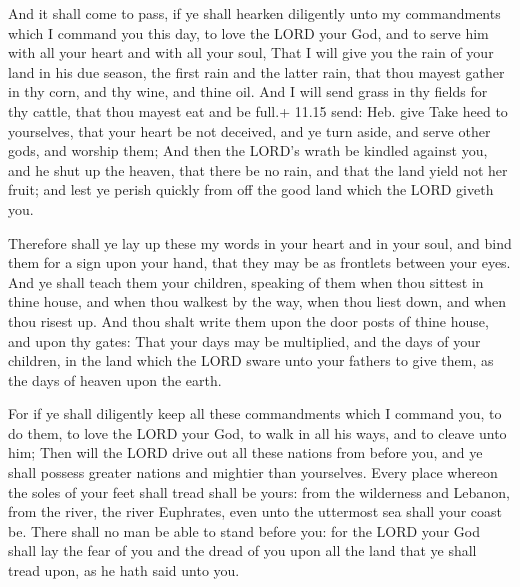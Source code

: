  And it shall come to pass, if ye shall hearken
diligently unto my commandments which I command you this day, to love
the LORD your God, and to serve him with all your heart and with all
your soul,  That I will give you the rain of your land in
his due season, the first rain and the latter rain, that thou mayest
gather in thy corn, and thy wine, and thine oil.  And I
will send grass in thy fields for thy cattle, that thou mayest eat and
be full.+ 11.15 send: Heb. give  Take heed to yourselves,
that your heart be not deceived, and ye turn aside, and serve other
gods, and worship them;  And then the LORD's wrath be
kindled against you, and he shut up the heaven, that there be no rain,
and that the land yield not her fruit; and lest ye perish quickly from
off the good land which the LORD giveth you.

 Therefore shall ye lay up these my words in your heart
and in your soul, and bind them for a sign upon your hand, that they may
be as frontlets between your eyes.  And ye shall teach them
your children, speaking of them when thou sittest in thine house, and
when thou walkest by the way, when thou liest down, and when thou risest
up.  And thou shalt write them upon the door posts of thine
house, and upon thy gates:  That your days may be
multiplied, and the days of your children, in the land which the LORD
sware unto your fathers to give them, as the days of heaven upon the
earth.

 For if ye shall diligently keep all these commandments
which I command you, to do them, to love the LORD your God, to walk in
all his ways, and to cleave unto him;  Then will the LORD
drive out all these nations from before you, and ye shall possess
greater nations and mightier than yourselves.  Every place
whereon the soles of your feet shall tread shall be yours: from the
wilderness and Lebanon, from the river, the river Euphrates, even unto
the uttermost sea shall your coast be.  There shall no man
be able to stand before you: for the LORD your God shall lay the fear of
you and the dread of you upon all the land that ye shall tread upon, as
he hath said unto you.

